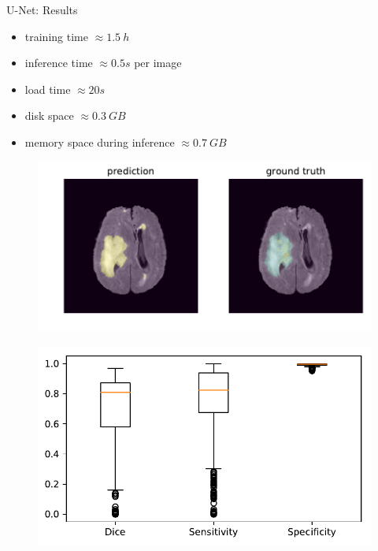 \documentclass[final]{beamer}
\newlength{\onecolwid}
\newlength{\twocolwid}
\begin{document}
\begin{frame}[t]
\begin{columns}[t]
\begin{column}{\twocolwid}
\begin{columns}[t,totalwidth=\twocolwid]
\begin{column}{\onecolwid}
\begin{block}{U-Net: Results}
\begin{itemize}[label={}]
\item training time $\approx \SI{1.5}{h}$
\item inference time $\approx \si{0.5}{s}$ per image
\item load time $\approx \si{20}{s}$
\item disk space $\approx \SI{0.3}{GB}$
\item memory space during inference $\approx \SI{0.7}{GB}$
\end{itemize}
\begin{figure}
\centering
\includegraphics[width=0.9\linewidth]{test_Flair_84}
\end{figure}

\begin{figure}
\includegraphics[width=0.9\linewidth]{boxplots}
\end{figure}
\end{block}


\end{column} %


\end{columns}
\end{column}
\end{columns}
\end{frame}
\end{document}
